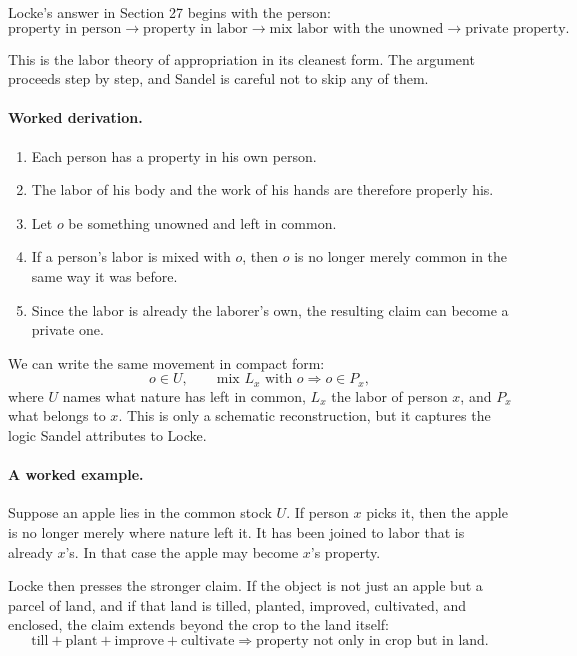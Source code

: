 Locke's answer in Section 27 begins with the person:
\begin{equation}
\text{property in person}\to \text{property in labor}\to \text{mix labor with the unowned}\to \text{private property}.
\end{equation}

This is the labor theory of appropriation in its cleanest form. The argument proceeds step by step, and Sandel is careful not to skip any of them.

\paragraph{Worked derivation.}
\begin{enumerate}
\item Each person has a property in his own person.
\item The labor of his body and the work of his hands are therefore properly his.
\item Let \(o\) be something unowned and left in common.
\item If a person's labor is mixed with \(o\), then \(o\) is no longer merely common in the same way it was before.
\item Since the labor is already the laborer's own, the resulting claim can become a private one.
\end{enumerate}

We can write the same movement in compact form:
\begin{equation}
o\in U,\qquad \text{mix }L_x\text{ with }o \Longrightarrow o\in P_x,
\end{equation}
where \(U\) names what nature has left in common, \(L_x\) the labor of person \(x\), and \(P_x\) what belongs to \(x\). This is only a schematic reconstruction, but it captures the logic Sandel attributes to Locke.

\paragraph{A worked example.}
Suppose an apple lies in the common stock \(U\). If person \(x\) picks it, then the apple is no longer merely where nature left it. It has been joined to labor that is already \(x\)'s. In that case the apple may become \(x\)'s property.

Locke then presses the stronger claim. If the object is not just an apple but a parcel of land, and if that land is tilled, planted, improved, cultivated, and enclosed, the claim extends beyond the crop to the land itself:
\begin{equation}
\text{till}+\text{plant}+\text{improve}+\text{cultivate}
\Longrightarrow
\text{property not only in crop but in land.}
\end{equation}

